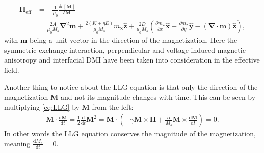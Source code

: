 \begin{align}
\label{eq:EffectiveField}
\nonumber\mathbold{H}_{\textrm{eff}} &= -\frac{1}{\mu_0}\frac{\delta\epsilon[\mathbold{M}]}{\delta\mathbold{M}} \\
&= \frac{2A}{\mu_0M_s}\mathbold{\nabla}^2\mathbold{m}+\frac{2(K+\eta E)}{\mu_0M_s}m_{\text{Z}}\mathbold{\hat{z}} + \frac{2D}{\mu_0M_s}\left(\frac{\partial m_{\text{Z}}}{\partial x}\mathbold{\hat{x}}+\frac{\partial m_{\text{Z}}}{\partial y}\mathbold{\hat{y}}-(\mathbold{\nabla}\cdot\mathbold{m})\mathbold{\hat{z}}\right),
\end{align}
with $\mathbold{m}$ being a unit vector in the direction of the magnetization. Here the symmetric exchange interaction, perpendicular and voltage induced magnetic anisotropy and interfacial DMI have been taken into consideration in the effective field.

Another thing to notice about the LLG equation is that only the direction of the magnetization $\mathbold{M}$ and not its magnitude changes with time. This can be seen by multiplying \eqref{eq:LLG} by $\mathbold{M}$ from the left:
\begin{align}
\mathbold{M}\cdot\frac{\textrm{d}\mathbold{M}}{\textrm{d}t} = \frac{1}{2}\frac{\textrm{d}}{\textrm{d}t} \mathbold{M}^2 =  \mathbold{M}\cdot\left(-\gamma\mathbold{M}\times\mathbold{H}+\frac{\alpha}{M_s}\mathbold{M}\times\frac{\textrm{d}\mathbold{M}}{\textrm{d}t}\right) = 0.
\end{align}
In other words the LLG equation conserves the magnitude of the magnetization, meaning $\frac{\textrm{d} M_s}{\textrm{d}t} = 0$.

